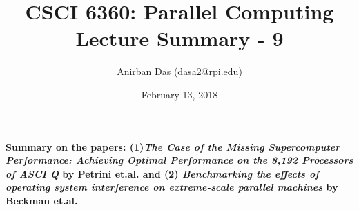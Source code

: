 \documentclass[a4paper,12 pt]{article}
\title{\vspace{-2.0cm}CSCI 6360: Parallel Computing Lecture Summary - 9}
\author{Anirban Das (dasa2@rpi.edu) }
\date{February 13, 2018}
\begin{document}
\maketitle

\paragraph{Summary on the papers: (1)\textit{The Case of the Missing Supercomputer Performance:
Achieving Optimal Performance on the 8,192 Processors of ASCI Q} by Petrini et.al. and (2) \textit{Benchmarking the effects of operating system interference
on extreme-scale parallel machines} by Beckman et.al.\\\\}
\end{document}
